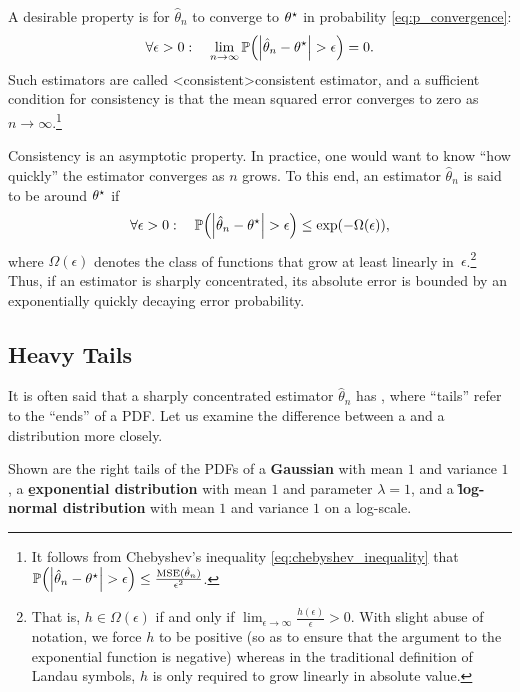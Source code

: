 A desirable property is for $\hat{\theta}_n$ to converge to $\theta^\star$ in probability \eqref{eq:p_convergence}: \begin{align*}
  \forall \epsilon > 0: \quad \lim_{n\to\infty} \Pr{\abs{\hat{\theta}_n - \opt{\theta}} > \epsilon} = 0.
\end{align*}
Such estimators are called \midx<consistent>{consistent estimator}, and a sufficient condition for consistency is that the mean squared error converges to zero as $n \to \infty$.\footnote{It follows from Chebyshev's inequality \eqref{eq:chebyshev_inequality} that $\Pr{\abs{\hat{\theta}_n - \opt{\theta}} > \epsilon} \leq \frac{\mathrm{MSE}(\hat{\theta}_n)}{\epsilon^2}$.}

Consistency is an asymptotic property.
In practice, one would want to know ``how quickly'' the estimator converges as $n$ grows.
To this end, an estimator $\hat{\theta}_n$ is said to be  around $\theta^\star$ if \begin{align}
  \forall \epsilon > 0: \quad \Pr{\abs{\hat{\theta}_n - \opt{\theta}} > \epsilon} \leq \exp(-\Omega(\epsilon)),
\end{align} where $\Omega(\epsilon)$ denotes the class of functions that grow at least linearly in~$\epsilon$.\footnote{That is, $h \in \Omega(\epsilon)$ if and only if $\lim_{\epsilon \to \infty} \frac{h(\epsilon)}{\epsilon} > 0$. With slight abuse of notation, we force $h$ to be positive (so as to ensure that the argument to the exponential function is negative) whereas in the traditional definition of Landau symbols, $h$ is only required to grow linearly in absolute value.}
Thus, if an estimator is sharply concentrated, its absolute error is bounded by an exponentially quickly decaying error probability.

\subsection{Heavy Tails}\label{sec:fundamentals:parameter_esitmation:heavy_tails}

It is often said that a sharply concentrated estimator $\hat{\theta}_n$ has , where ``tails'' refer to the ``ends'' of a PDF.
Let us examine the difference between a  and a  distribution more closely.

\begin{marginfigure}
	\caption{Shown are the right tails of the PDFs of a \textbf{Gaussian} with mean $1$ and variance $1$, a \textbf{\b{exponential distribution}} with mean $1$ and parameter $\lambda=1$, and a \textbf{\r{log-normal distribution}} with mean $1$ and variance $1$ on a log-scale.}
\end{marginfigure}

